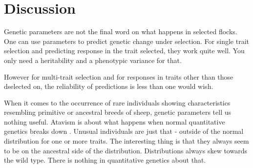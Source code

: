 \documentclass[titlepage]{article}  %
\begin{document}
\section{Discussion}
Genetic parameters are not the final word on what happens in selected flocks. One can use parameters to predict genetic change under selection. For single trait selection and predicting response in the trait selected, they work quite well. You only need a heritability and a phenotypic variance for that. 

However for multi-trait selection and for responses in traits other than those dselected on, the reliability of predictions is less than one would wish. 

When it comes to the occurrence of rare individuals showing  characteristics resembling primitive or ancestral breeds of sheep, genetic parameters tell us nothing useful. Atavism is about what happens when normal quantitative genetics breaks down . Unusual individuals are just that - outside of the normal distribution for one or more traits. The interesting thing is that they always seem to be on the ancestral side of the distribution. Distributions always skew towards the wild type. There is nothing in quantitative genetics about that. 
\end{document}
